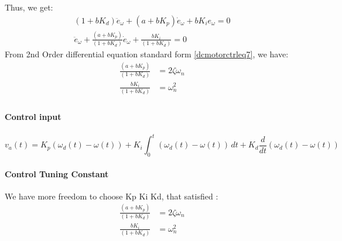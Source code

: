 Thus, we get:
\begin{equation}
	\label{dcmotorctrleq11}
	\begin{split}
		(1+bK_d)\ddot{e}_{\omega} + (a+bK_p)\dot{e}_{\omega} + bK_ie_{\omega} = 0 \\
		\ddot{e}_{\omega} + \frac{(a+bK_p)}{(1+bK_d)}\dot{e}_{\omega} + \frac{bK_i}{(1+bK_d)} = 0
	\end{split}
\end{equation}
From 2nd Order differential equation standard form \autoref{dcmotorctrleq7}, we have:
\[
\begin{split}
	\frac{(a+bK_p)}{(1+bK_d)} &= 2\zeta\omega_n \\
	\frac{bK_i}{(1+bK_d)}     &= \omega_n^2 \\
\end{split}
\]

\begin{tcolorbox}[title=Velocity Control using PID Linear]
	\paragraph{Control input}
	\[v_a(t) = K_p(\omega_d(t) - \omega(t)) + K_i \int_{0}^{t} (\omega_d(t) - \omega(t)) \,dt + K_d \frac{d}{dt} (\omega_d(t) - \omega(t))\]
	\paragraph{Control Tuning Constant}
	We have more freedom to choose Kp Ki Kd, that satisfied :
	\[
	\begin{split}
		\frac{(a+bK_p)}{(1+bK_d)} &= 2\zeta\omega_n \\
		\frac{bK_i}{(1+bK_d)}     &= \omega_n^2 \\
	\end{split}
	\]
\end{tcolorbox}



